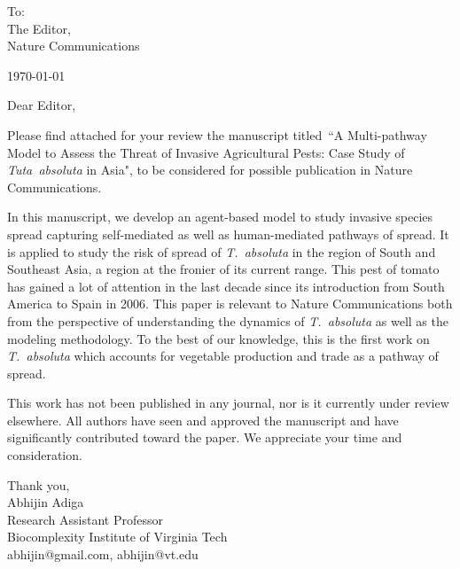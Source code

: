 \documentclass{article}
\newcommand\tab[1][1cm]{\hspace*{#1}}
\newcommand{\tuta}{\emph{T.~absoluta}}
\begin{document}
To: \\
\tab The Editor,\\
\tab Nature Communications
\begin{flushright}
\date[\today
\end{flushright}

\RaggedRight

Dear Editor,
\par
Please find attached for your review the manuscript titled~``A
Multi-pathway Model to Assess the Threat of Invasive Agricultural Pests:
Case Study of \emph{Tuta~absoluta} in Asia", to be considered for possible
publication in Nature Communications.
\par
In this manuscript, we develop an agent-based model to study invasive
species spread capturing self-mediated as well as human-mediated pathways
of spread. It is applied to study the risk of spread of \tuta{} in the
region of South and Southeast Asia, a region at the fronier of its current
range. This pest of tomato has gained a lot of attention in the last decade
since its introduction from South America to Spain in 2006.  This paper is
relevant to Nature Communications both from the perspective of
understanding the dynamics of \tuta{} as well as the modeling methodology.
To the best of our knowledge, this is the first work on \tuta{} which
accounts for vegetable production and trade as a pathway of spread.
\par
This work has not been published in any journal, nor is it currently under
review elsewhere. All authors have seen and approved the manuscript and
have significantly contributed toward the paper. We appreciate your time
and consideration.
\par
Thank you,\\
Abhijin Adiga\\
Research Assistant Professor\\
Biocomplexity Institute of Virginia Tech\\
abhijin@gmail.com, abhijin@vt.edu
\end{document}
